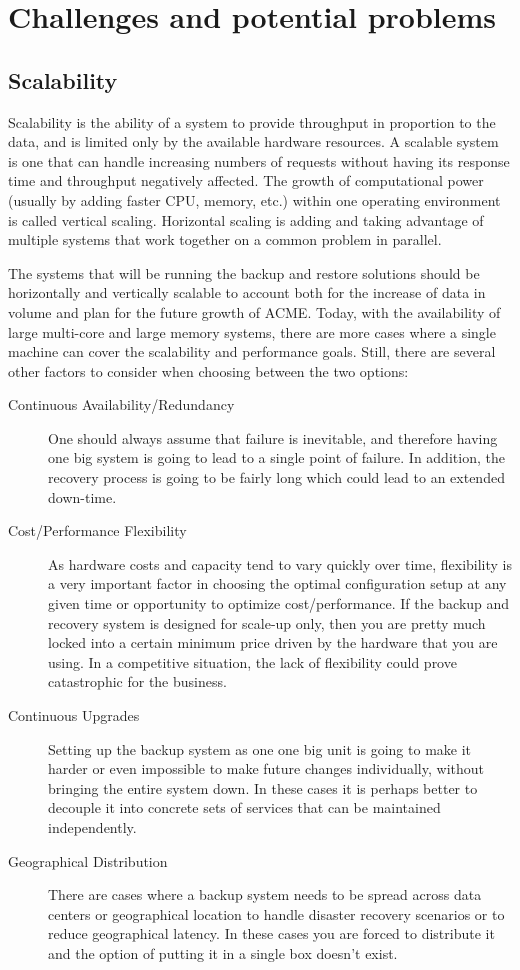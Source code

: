 \section{Challenges and potential problems}

\subsection{Scalability}
Scalability is the ability of a system to provide throughput in
proportion to the data, and is limited only by the available hardware
resources. A scalable system is one that can handle increasing numbers
of requests without having its response time and throughput negatively
affected. The growth of computational power (usually by adding faster
CPU, memory, etc.) within one operating environment is called vertical
scaling. Horizontal scaling is adding and taking advantage of multiple
systems that work together on a common problem in parallel. %

The systems that will be running the backup and restore solutions should
be horizontally and vertically scalable to account both for the increase
of data in volume and plan for the future growth of ACME. Today, with
the availability of large multi-core and large memory systems, there are
more cases where a single machine can cover the scalability and
performance goals. Still, there are several other factors to consider
when choosing between the two options:

\begin{description}
	\item[Continuous Availability/Redundancy] One should always assume
		that failure is inevitable, and therefore having one big system
		is going to lead to a single point of failure. In addition, the
		recovery process is going to be fairly long which could lead to
		an extended down-time.
	\item[Cost/Performance Flexibility] As hardware costs and capacity tend
		to vary quickly over time, flexibility is a very important factor in
		choosing the optimal configuration setup at any given time or
		opportunity to optimize cost/performance. If the backup and recovery
		system is designed for scale-up only, then you are pretty much
		locked into a certain minimum price driven by the hardware that you
		are using. In a competitive situation, the lack of flexibility could
		prove catastrophic for the business.
	\item[Continuous Upgrades] Setting up the backup system as one one
		big unit is going to make it harder or even impossible to make
		future changes individually, without bringing the entire system
		down. In these cases it is perhaps better to decouple it into
		concrete sets of services that can be maintained independently.
	\item[Geographical Distribution] There are cases where a backup
		system needs to be spread across data centers or geographical
		location to handle disaster recovery scenarios or to reduce
		geographical latency. In these cases you are forced to
		distribute it and the option of putting it in a single box
		doesn't exist.
\end{description}

